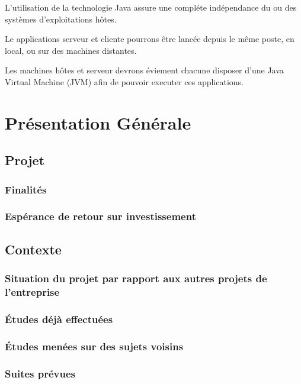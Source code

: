 \documentclass[10pt,a4paper]{article}
\begin{document}
L'utilisation de la technologie Java assure une compléte indépendance du ou des systèmes d'exploitations hôtes.

Le applications serveur et cliente pourrons être lancée depuis le même poste, en local, ou sur des machines distantes.

Les machines hôtes et serveur devrons éviement chacune disposer d'une Java Virtual Machine (JVM) afin de pouvoir executer ces applications.

\section{Présentation Générale}
\subsection{Projet}
\subsubsection{Finalités}
\subsubsection{Espérance de retour sur investissement}

\subsection{Contexte}
\subsubsection{Situation du projet par rapport aux autres projets de l’entreprise}
\subsubsection{Études déjà effectuées}
\subsubsection{Études menées sur des sujets voisins}
\subsubsection{Suites prévues}
\end{document}

